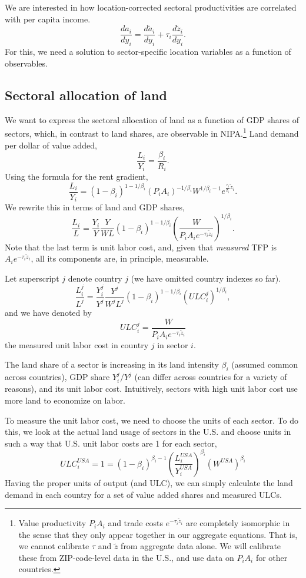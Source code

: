 \documentclass[12pt]{article}
\begin{document}
We are interested in how location-corrected sectoral productivities are correlated with per capita income.
\[
\frac{d a_i}{dy_i} = \frac{d \tilde a_i}{dy_i}+ \tau_{i}\frac{d \tilde z_i}{dy_i}.
\]
For this, we need a solution to sector-specific location variables as a function of observables.  

\subsection{Sectoral allocation of land}
We want to express the sectoral allocation of land as a function of GDP shares of sectors,  which, in contrast to land shares, are observable in NIPA.\footnote{Value productivity $P_iA_i$ and trade costs $e^{-\tau_i \tilde z_i}$ are completely isomorphic in the sense that they only appear together in our aggregate equations. That is, we cannot calibrate $\tau$ and $\tilde z$ from aggregate data alone. We will calibrate these from ZIP-code-level data in the U.S., and use data on $P_iA_i$ for other countries.} Land demand per dollar of value added,
\[
\frac{L_i}{Y_i} =
\frac{\beta_i}{R_i}.
\]
Using the formula for the rent gradient, 
\[
\frac{L_i}{Y_i} =
(1-\beta_i)^{1-1/\beta_i} (P_iA_i)^{-1/\beta_i}W^{1/\beta_i-1} e^{\frac{\tau_i}{\beta_i} \tilde z_i}.
\]
We rewrite this in terms of land and GDP shares,
\[
\frac{L_i}{L} = \frac{Y_i}{Y}\frac{Y}{WL}
(1-\beta_i)^{1-1/\beta_i}\left(\frac{W}{P_iA_i e^{-\tau_i\tilde z_i}}\right)^{1/\beta_i}.
\]
Note that the last term is unit labor cost, and, given that \emph{measured} TFP is $A_i e^{-\tau_i\tilde z_i}$, all its components are, in principle, measurable.

Let superscript $j$ denote country $j$ (we have omitted country indexes so far).
\begin{equation}
\label{eq:LandShare}
\frac{L_i^j}{L^j} = \frac{Y_i^j}{Y^j}\frac{Y^j}{W^jL^j}
(1-\beta_i)^{1-1/\beta_i}\left(ULC_i^j\right)^{1/\beta_i} ,
\end{equation}
and we have denoted by
\[
ULC_i^j
=
\frac{W}{P_iA_i e^{-\tau_i\tilde z_i}}
\]
the measured unit labor cost in country $j$ in sector $i$.

The land share of a sector is increasing in its land intensity $\beta_i$ (assumed common across countries), GDP share ${Y_i^j}/{Y^j}$ (can differ across countries for a variety of reasons), and its unit labor cost. Intuitively, sectors with high unit labor cost use more land to economize on labor.

To measure the unit labor cost, we need to choose the units of each sector. To do this, we look at the actual land usage of sectors in the U.S. and choose units in such a way that U.S. unit labor costs are 1 for each sector,
\begin{equation}
\label{eq:US_ULC}
ULC_i^{USA} =1=(1-\beta_i)^{\beta_i-1} \left(\frac{L_i^{USA}}{Y_i^{USA}}\right)^{\beta_i}(W^{USA})^{\beta_i}
\end{equation}
Having the proper units of output (and ULC), we can simply calculate the land demand in each country for a set of value added shares and measured ULCs.
\end{document}
